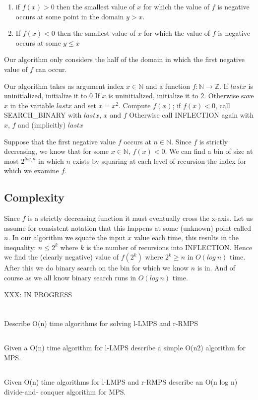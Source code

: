 \documentclass{amsart}
\theoremstyle{definition}
\theoremstyle{remark}
\numberwithin{equation}{section}
\newcommand{\NN}{\mathbb N}
\newcommand{\ZZ}{\mathbb Z}
\begin{document}
\begin{enumerate}

  \item if $f(x) > 0$ then the smallest value of $x$ for which the value
of $f$ is negative occurs at some point in the domain $y>x$.

  \item If $f(x) < 0$ then the smallest value of $x$ for which the value
  of $f$ is negative occurs at some $y \leq x$

\end{enumerate}

Our algorithm only considers the half of the domain in which the first negative
value of $f$ can occur.


Our algorithm takes as argument index $x \in \NN$ and a function $f :
\NN \rightarrow \ZZ$. If $lastx$ is uninitialized, initialize it to $0$
If $x$ is uninitialized, initialize it to $2$. Otherwise save $x$ in the
variable $lastx$ and set $x = x^2$. Compute $f(x)$; if $f(x) < 0$, call
SEARCH\_BINARY with $lastx$, $x$ and $f$ Otherwise call INFLECTION again
with $x$, $f$ and (implicitly) $lastx$

\proof
Suppose that the first negative value $f$ occurs at $n \in \NN$.
Since $f$ is strictly decreasing, we know that for some $x \in \NN$, $f(x) < 0$.
We can find a bin of size at most $2^{log_{2} {n}}$ in which $n$ exists by
squaring at each level of recursion the index for which we examine $f$.

\subsection{Complexity}

Since $f$ is a strictly decreasing function it must eventually cross the
x-axis. Let us assume for consistent notation that this happens at some
(unknown) point called $n$. In our algorithm we square the input $x$
value each time, this results in the inequality: $n \leq 2^k$ where $k$
is the number of recursions into INFLECTION. Hence we find the (clearly
negative) value of $f(2^k)$ where $2^k \geq n$ in $O(log\ n)$ time.
After this we do binary search on the bin for which we know $n$ is in.
And of course as we all know binary search runs in $O( log\ n )$ time.


XXX: IN PROGRESS
\section{}

\subsection{} Describe O(n) time algorithms for solving l-LMPS and r-RMPS

\subsection{} Given a O(n) time algorithm for l-LMPS describe a simple O(n2) algorithm for MPS.

\subsection{} Given O(n) time algorithms for l-LMPS and r-RMPS describe an O(n log n) divide-and- conquer algorithm for MPS.
\end{document}
